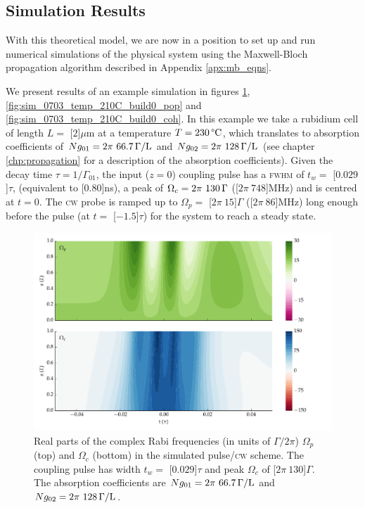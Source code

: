   \subsection{Simulation Results}

    With this theoretical model, we are now in a position to set up and run
    numerical simulations of the physical system using the Maxwell-Bloch
    propagation algorithm described in Appendix \ref{apx:mb_eqns}.

    We present results of an example simulation in figures
    \ref{fig:sim_0703_temp_210C_build0_fields},
    \ref{fig:sim_0703_temp_210C_build0_pop} and
    \ref{fig:sim_0703_temp_210C_build0_coh}. In this example we take a rubidium
    cell of length $L = $ \unit[$2$]{$\mu$m} at a temperature $T =
    \unit[230]{\textrm{\textdegree C}}$, which translates to absorption
    coefficients of $Ng_{01} = \unit[2\pi~66.7]{\Gamma/L}$ and $Ng_{02} =
    \unit[2\pi~128]{\Gamma/L}$ (see chapter \ref{chp:propagation} for a
    description of the absorption coefficients). Given the decay time $\tau =
    1/\Gamma_{01}$, the input ($z\!=\!0$) coupling pulse has a \textsc{fwhm} of
    $t_w = $ \unit[$0.029$]{$\tau$}, (equivalent to \unit[$0.80$]{ns}), a peak
    of $\Omega_c = \unit[2\pi~130]{\Gamma}$ (\unit[$2\pi~748$]{MHz}) and is
    centred at $t\!=\!0$. The \textsc{cw} probe is ramped up to $\Omega_p = $
    \unit[$2\pi~15$]{$\Gamma$} (\unit[$2\pi~86$]{MHz}) long enough before the
    pulse (at $t = $ \unit[$-1.5$]{$\tau$}) for the system to reach a steady
    state.

    \begin{figure}[h]
      \includegraphics[width=\linewidth]
        {figs/06_simultons/mb_vee2g_build0_15c_130p_0330t_230C_sb50_120vel000_00_002um_fig2.pdf}
      \caption{
      Real parts of the complex Rabi frequencies (in units of $\Gamma/2\pi$)
      $\Omega_{p}$ (top) and $\Omega_{c}$ (bottom)  in the simulated
      pulse/\textsc{cw} scheme. The coupling pulse has width $t_w = $
      \unit[$0.029$]{$\tau$} and peak $\Omega_c$ of \unit[$2\pi~130$]{$\Gamma$}.
      The absorption coefficients are $Ng_{01} = \unit[2\pi~66.7]{\Gamma/L}$ and
      $Ng_{02} = \unit[2\pi~128]{\Gamma/L}$.
      }
      \label{fig:sim_0703_temp_210C_build0_fields}
    \end{figure}

